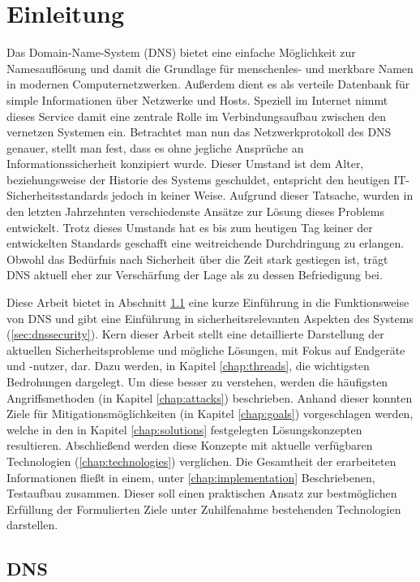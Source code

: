 \chapter{Einleitung}
Das Domain-Name-System (DNS) bietet eine einfache Möglichkeit zur Namesauflösung und damit die Grundlage für menschenles- und merkbare Namen in modernen Computernetzwerken. Außerdem dient es als verteile Datenbank für simple Informationen über Netzwerke und Hosts. Speziell im Internet nimmt dieses Service damit eine zentrale Rolle im Verbindungsaufbau zwischen den vernetzen Systemen ein. Betrachtet man nun das Netzwerkprotokoll des DNS genauer, stellt man fest, dass es ohne jegliche Ansprüche an Informationssicherheit konzipiert wurde. Dieser Umstand ist dem Alter, beziehungsweise der Historie des Systems geschuldet, entspricht den heutigen IT-Sicherheitsstandards jedoch in keiner Weise. Aufgrund dieser Tatsache, wurden in den letzten Jahrzehnten verschiedenste Ansätze zur Lösung dieses Problems entwickelt. Trotz dieses Umstands hat es bis zum heutigen Tag keiner der entwickelten Standards geschafft eine weitreichende Durchdringung zu erlangen. Obwohl das Bedürfnis nach Sicherheit über die Zeit stark gestiegen ist, trägt DNS aktuell eher zur Verschärfung der Lage als zu dessen Befriedigung bei.

Diese Arbeit bietet in Abschnitt \ref{sec:dns} eine kurze Einführung in die Funktionsweise von DNS und gibt eine Einführung in sicherheitsrelevanten Aspekten des Systems (\ref{sec:dnssecurity}). Kern dieser Arbeit stellt eine detaillierte Darstellung der aktuellen Sicherheitsprobleme und mögliche Lösungen, mit Fokus auf Endgeräte und -nutzer, dar. Dazu werden, in Kapitel \ref{chap:threads}, die wichtigsten Bedrohungen dargelegt. Um diese besser zu verstehen, werden die häufigsten Angriffsmethoden (in Kapitel \ref{chap:attacks}) beschrieben. Anhand dieser konnten Ziele für Mitigationsmöglichkeiten (in Kapitel \ref{chap:goals}) vorgeschlagen werden, welche in den in Kapitel \ref{chap:solutions} festgelegten Lösungskonzepten resultieren. Abschließend werden diese Konzepte mit aktuelle verfügbaren Technologien (\ref{chap:technologies}) verglichen. Die Gesamtheit der erarbeiteten Informationen fließt in einem, unter \ref{chap:implementation} Beschriebenen, Testaufbau zusammen. Dieser soll einen praktischen Ansatz zur bestmöglichen Erfüllung der Formulierten Ziele unter Zuhilfenahme bestehenden Technologien darstellen.

\section{DNS}
\label{sec:dns}

